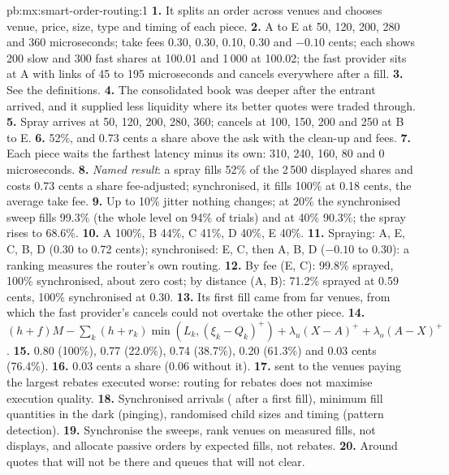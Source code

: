 \begin{solution}{pb:mx:smart-order-routing:1}
\textbf{1.} It splits an order across venues and chooses venue, price, size, type and timing of each piece.
\textbf{2.} A to E at 50, 120, 200, 280 and 360 microseconds; take fees 0.30, 0.30, 0.10, 0.30 and $-0.10$ cents; each shows 200 slow and 300 fast
shares at 100.01 and 1\,000 at 100.02; the fast provider sits at A with links of 45 to 195 microseconds and cancels everywhere after a fill.
\textbf{3.} See the definitions.
\textbf{4.} The consolidated book was deeper after the entrant arrived, and it supplied less liquidity where its better quotes were traded through.
\textbf{5.} Spray arrives at 50, 120, 200, 280, 360; cancels at 100, 150, 200 and 250 at B to E.
\textbf{6.} 52\%, and 0.73 cents a share above the ask with the clean-up and fees.
\textbf{7.} Each piece waits the farthest latency minus its own: 310, 240, 160, 80 and 0 microseconds.
\textbf{8.} \emph{Named result}: a spray fills 52\% of the 2\,500 displayed shares and costs 0.73 cents a share fee-adjusted; synchronised, it fills
100\% at 0.18 cents, the average take fee.
\textbf{9.} Up to 10\% jitter nothing changes; at 20\% the synchronised sweep fills 99.3\% (the whole level on 94\% of trials) and at 40\% 90.3\%; the
spray rises to 68.6\%.
\textbf{10.} A 100\%, B 44\%, C 41\%, D 40\%, E 40\%.
\textbf{11.} Spraying: A, E, C, B, D (0.30 to 0.72 cents); synchronised: E, C, then A, B, D ($-0.10$ to 0.30): a ranking measures the router's own
routing.
\textbf{12.} By fee (E, C): 99.8\% sprayed, 100\% synchronised, about zero cost; by distance (A, B): 71.2\% sprayed at 0.59 cents, 100\% synchronised at
0.30.
\textbf{13.} Its first fill came from far venues, from which the fast provider's cancels could not overtake the other piece.
\textbf{14.} $(h+f)M-\sum_k(h+r_k)\min(L_k,(\xi_k-Q_k)^+)+\lambda_u(X-A)^++\lambda_o(A-X)^+$.
\textbf{15.} 0.80 (100\%), 0.77 (22.0\%), 0.74 (38.7\%), 0.20 (61.3\%) and 0.03 cents (76.4\%).
\textbf{16.} 0.03 cents a share (0.06 without it).
\textbf{17.}  sent to the venues paying the largest rebates executed worse: routing for rebates does not maximise execution quality.
\textbf{18.} Synchronised arrivals ( after a first fill), minimum fill quantities in the dark (pinging), randomised child sizes and timing
(pattern detection).
\textbf{19.} Synchronise the sweeps, rank venues on measured fills, not displays, and allocate passive orders by expected fills, not rebates.
\textbf{20.} Around quotes that will not be there and queues that will not clear.
\end{solution}

